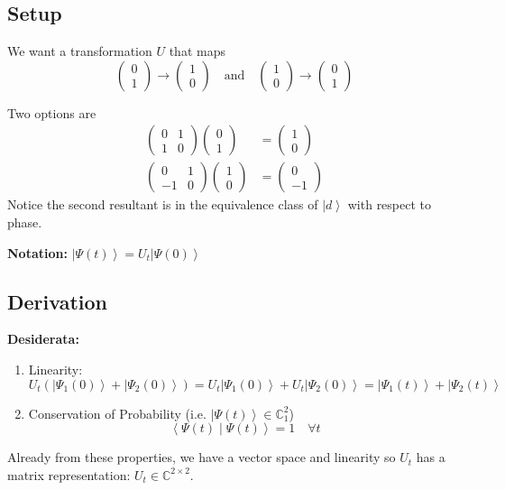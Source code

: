 \documentclass[12pt]{article}
\newcommand{\brak}[1]{\left\langle #1 \right\rangle}
\newcommand{\C}{\mathbb{C}}
\newcommand{\ket}[1]{\left\vert #1 \right\rangle}
\begin{document}
\subsection*{Setup}
We want a transformation $U$ that maps 
\[\begin{pmatrix}
    0\\1
\end{pmatrix} \to \begin{pmatrix}
    1\\0
\end{pmatrix} \quad \text{and} \quad \begin{pmatrix}
    1\\0
\end{pmatrix}\to \begin{pmatrix}
    0\\1
\end{pmatrix}\]

Two options are 
\begin{align*}
    \begin{pmatrix}
        0 & 1\\ 
        1 & 0
    \end{pmatrix}\begin{pmatrix}
        0\\1
    \end{pmatrix} &= \begin{pmatrix}
        1\\0
    \end{pmatrix}\\
    \begin{pmatrix}
        0 & 1\\ 
        -1 & 0
    \end{pmatrix}\begin{pmatrix}
        1\\0
    \end{pmatrix} &=   
    \begin{pmatrix}
        0\\-1
    \end{pmatrix} 
\end{align*}
Notice the second resultant is in the equivalence class of $\ket d$ with respect to phase. 

\textbf{Notation:} $\ket{\Psi(t)} = U_t\ket{\Psi(0)}$

\subsection*{Derivation}
\textbf{Desiderata:}
\begin{enumerate}
    \item Linearity:
    \[U_t (\ket{\Psi_1(0)} + \ket{\Psi_2(0)}) = U_t\ket{\Psi_1(0)} + U_t\ket{\Psi_2(0)} = \ket{\Psi_1(t)} + \ket{\Psi_2(t)}\]

    \item Conservation of Probability (i.e. $\ket{\Psi(t)} \in \C_1^2$)
    \[\brak{\Psi(t) \; | \; \Psi(t)} = 1 \quad \forall t\]
\end{enumerate}
Already from these properties, we have a vector space and linearity so $U_t$ has a matrix representation: $U_t \in \C^{2 \times 2}$. 
\end{document}
